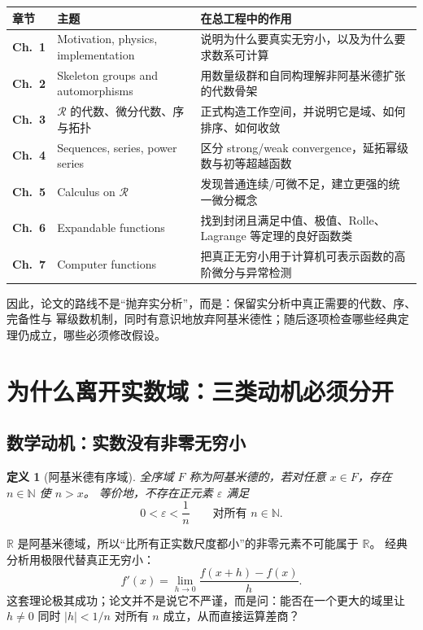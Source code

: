 \documentclass[11pt,a4paper]{article}
\newtheorem{definition}{定义}[section]
\theoremstyle{remark}
\newcommand{\LC}{\mathcal R}
\newcommand{\R}{\mathbb R}
\begin{document}
\begin{center}
\begin{tabularx}{\textwidth}{>{\bfseries}p{1.4cm}p{4.2cm}X}
\toprule
章节 & 主题 & 在总工程中的作用\\
\midrule
Ch.~1 & Motivation, physics, implementation & 说明为什么要真实无穷小，以及为什么要求数系可计算\\
Ch.~2 & Skeleton groups and automorphisms & 用数量级群和自同构理解非阿基米德扩张的代数骨架\\
Ch.~3 & $\LC$ 的代数、微分代数、序与拓扑 & 正式构造工作空间，并说明它是域、如何排序、如何收敛\\
Ch.~4 & Sequences, series, power series & 区分 strong/weak convergence，延拓幂级数与初等超越函数\\
Ch.~5 & Calculus on $\LC$ & 发现普通连续/可微不足，建立更强的统一微分概念\\
Ch.~6 & Expandable functions & 找到封闭且满足中值、极值、Rolle、Lagrange 等定理的良好函数类\\
Ch.~7 & Computer functions & 把真正无穷小用于计算机可表示函数的高阶微分与异常检测\\
\bottomrule
\end{tabularx}
\end{center}

因此，论文的路线不是“抛弃实分析”，而是：保留实分析中真正需要的代数、序、完备性与
幂级数机制，同时有意识地放弃阿基米德性；随后逐项检查哪些经典定理仍成立，哪些必须修改假设。

\section{为什么离开实数域：三类动机必须分开}

\subsection{数学动机：实数没有非零无穷小}

\begin{definition}[阿基米德有序域]
全序域 $F$ 称为阿基米德的，若对任意 $x\in F$，存在 $n\in\mathbb N$ 使 $n>x$。
等价地，不存在正元素 $\varepsilon$ 满足
\[
0<\varepsilon<\frac1n\qquad\text{对所有 }n\in\mathbb N.
\]
\end{definition}

$\R$ 是阿基米德域，所以“比所有正实数尺度都小”的非零元素不可能属于 $\R$。
经典分析用极限代替真正无穷小：
\[
f'(x)=\lim_{h\to0}\frac{f(x+h)-f(x)}h.
\]
这套理论极其成功；论文并不是说它不严谨，而是问：能否在一个更大的域里让 $h\ne0$
同时 $|h|<1/n$ 对所有 $n$ 成立，从而直接运算差商？
\end{document}
